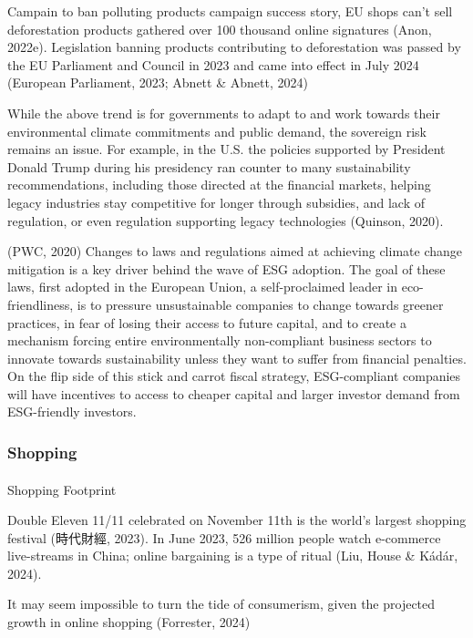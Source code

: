 \documentclass[
  letterpaper,
  DIV=11,
  numbers=noendperiod]{scrartcl}
\makeatletter
\let\oldparagraph\paragraph
\renewcommand{\paragraph}{
    \@ifstar
      \xxxParagraphStar
      \xxxParagraphNoStar
  }
\newcommand{\xxxParagraphStar}[1]{\oldparagraph*{#1}\mbox{}}
\newcommand{\xxxParagraphNoStar}[1]{\oldparagraph{#1}\mbox{}}
\makeatother
\begin{document}
Campain to ban polluting products campaign success story, EU shops can't
sell deforestation products gathered over 100 thousand online signatures
(Anon, 2022e). Legislation banning products contributing to
deforestation was passed by the EU Parliament and Council in 2023 and
came into effect in July 2024 (European Parliament, 2023; Abnett \&
Abnett, 2024)

While the above trend is for governments to adapt to and work towards
their environmental climate commitments and public demand, the sovereign
risk remains an issue. For example, in the U.S. the policies supported
by President Donald Trump during his presidency ran counter to many
sustainability recommendations, including those directed at the
financial markets, helping legacy industries stay competitive for longer
through subsidies, and lack of regulation, or even regulation supporting
legacy technologies (Quinson, 2020).

(PWC, 2020) Changes to laws and regulations aimed at achieving climate
change mitigation is a key driver behind the wave of ESG adoption. The
goal of these laws, first adopted in the European Union, a
self-proclaimed leader in eco-friendliness, is to pressure unsustainable
companies to change towards greener practices, in fear of losing their
access to future capital, and to create a mechanism forcing entire
environmentally non-compliant business sectors to innovate towards
sustainability unless they want to suffer from financial penalties. On
the flip side of this stick and carrot fiscal strategy, ESG-compliant
companies will have incentives to access to cheaper capital and larger
investor demand from ESG-friendly investors.

\subsubsection{Shopping}\label{shopping}

\paragraph{Shopping Footprint}\label{shopping-footprint}

Double Eleven 11/11 celebrated on November 11th is the world's largest
shopping festival (時代財經, 2023). In June 2023, 526 million people
watch e-commerce live-streams in China; online bargaining is a type of
ritual (Liu, House \& Kádár, 2024).

It may seem impossible to turn the tide of consumerism, given the
projected growth in online shopping (Forrester, 2024)
\end{document}
